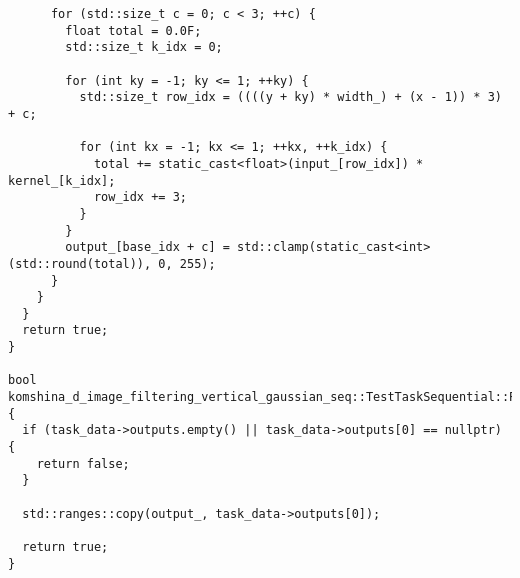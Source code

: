 \documentclass[12pt]{article}
\begin{document}
\begin{lstlisting}
      for (std::size_t c = 0; c < 3; ++c) {
        float total = 0.0F;
        std::size_t k_idx = 0;

        for (int ky = -1; ky <= 1; ++ky) {
          std::size_t row_idx = ((((y + ky) * width_) + (x - 1)) * 3) + c;

          for (int kx = -1; kx <= 1; ++kx, ++k_idx) {
            total += static_cast<float>(input_[row_idx]) * kernel_[k_idx];
            row_idx += 3;
          }
        }
        output_[base_idx + c] = std::clamp(static_cast<int>(std::round(total)), 0, 255);
      }
    }
  }
  return true;
}

bool komshina_d_image_filtering_vertical_gaussian_seq::TestTaskSequential::PostProcessingImpl() {
  if (task_data->outputs.empty() || task_data->outputs[0] == nullptr) {
    return false;
  }

  std::ranges::copy(output_, task_data->outputs[0]);

  return true;
}
\end{lstlisting}
\end{document}
